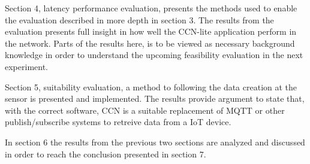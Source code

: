 Section 4, latency performance evaluation, presents the methods used to enable the evaluation described in more depth in section 3. The results from the evaluation presents full insight in how well the CCN-lite application perform in the network. Parts of the results here, is to be viewed as necessary background knowledge in order to understand the upcoming feasibility evaluation in the next experiment.

Section 5, suitability evaluation, a method to following the data creation at the sensor is presented and implemented. The results provide argument to state that, with the correct software, CCN is a suitable replacement of MQTT or other publish/subscribe systems to retreive data from a IoT device. 

In section 6 the results from the previous two sections are analyzed and discussed in order to reach the conclusion presented in section 7.